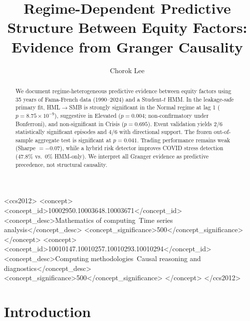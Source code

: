 \documentclass[sigconf]{acmart}
\begin{document}
\title{Regime-Dependent Predictive Structure Between Equity Factors: Evidence from Granger Causality}

\author{Chorok Lee}

\begin{abstract}
We document regime-heterogeneous predictive evidence between equity factors
using 35 years of Fama-French data (1990--2024) and a Student-$t$ HMM.
In the leakage-safe primary fit, HML$\to$SMB is strongly significant in the
Normal regime at lag 1 ($p = 8.75 \times 10^{-9}$), suggestive in Elevated
($p = 0.004$; non-confirmatory under Bonferroni), and non-significant in
Crisis ($p = 0.695$). Event validation yields 2/6 statistically significant
episodes and 4/6 with directional support. The frozen out-of-sample aggregate
test is significant at $p = 0.041$. Trading performance remains weak
(Sharpe $=-0.07$), while a hybrid risk detector improves COVID stress
detection (47.8\% vs.\ 0\% HMM-only). We interpret all Granger evidence as
predictive precedence, not structural causality.
\end{abstract}

\begin{CCSXML}
<ccs2012>
   <concept>
       <concept_id>10002950.10003648.10003671</concept_id>
       <concept_desc>Mathematics of computing~Time series analysis</concept_desc>
       <concept_significance>500</concept_significance>
   </concept>
   <concept>
       <concept_id>10010147.10010257.10010293.10010294</concept_id>
       <concept_desc>Computing methodologies~Causal reasoning and diagnostics</concept_desc>
       <concept_significance>500</concept_significance>
   </concept>
</ccs2012>
\end{CCSXML}



\maketitle

\section{Introduction}
\end{document}
